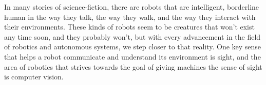 \documentclass[runningheads]{llncs}
\begin{document}



    In many stories of science-fiction, there are robots that are intelligent, borderline human in the way they talk, the way they walk, and the way they interact with their environments. These kinds of robots seem to be creatures that won't exist any time soon, and they probably won't, but with every advancement in the field of robotics and autonomous systems, we step closer to that reality. One key sense that helps a robot communicate and understand its environment is sight, and the area of robotics that strives towards the goal of giving machines the sense of sight is computer vision. 
\end{document}
